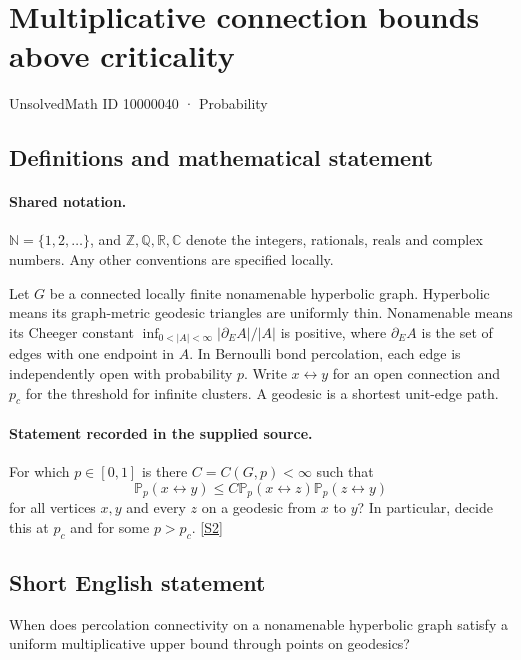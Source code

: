 \documentclass[11pt]{article}
\newcommand{\sref}[2]{\hyperlink{source:#1:#2}{[S#2]}}
\begin{document}
\setcounter{section}{10000039}
\section{Multiplicative connection bounds above criticality}\label{10000040}
{\small\sffamily UnsolvedMath ID 10000040 · Probability}
\subsection{Definitions and mathematical statement}

\paragraph{Shared notation.}$\mathbb N=\{1,2,\ldots\}$, and $\mathbb Z,\mathbb Q,\mathbb R,\mathbb C$ denote the integers, rationals, reals and complex numbers. Any other conventions are specified locally.


Let $G$ be a connected locally finite nonamenable hyperbolic graph. Hyperbolic means its graph-metric geodesic triangles are uniformly thin. Nonamenable means its Cheeger constant $\inf_{0<|A|<\infty}|\partial_E A|/|A|$ is positive, where $\partial_E A$ is the set of edges with one endpoint in $A$. In Bernoulli bond percolation, each edge is independently open with probability $p$. Write $x\leftrightarrow y$ for an open connection and $p_c$ for the threshold for infinite clusters. A geodesic is a shortest unit-edge path.
\paragraph{Statement recorded in the supplied source.}
For which $p\in[0,1]$ is there $C=C(G,p)<\infty$ such that
\[\mathbb P_p(x\leftrightarrow y)\le C\mathbb P_p(x\leftrightarrow z)\mathbb P_p(z\leftrightarrow y)\]
for all vertices $x,y$ and every $z$ on a geodesic from $x$ to $y$? In particular, decide this at $p_c$ and for some $p>p_c$. \sref{10000040}{2}
\subsection{Short English statement}
When does percolation connectivity on a nonamenable hyperbolic graph satisfy a uniform multiplicative upper bound through points on geodesics?
\end{document}
